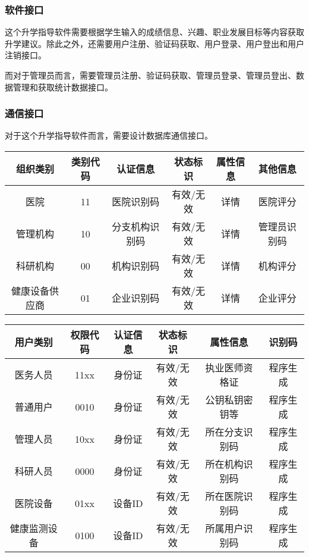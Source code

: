 \documentclass[UTF8]{ctexart}
\begin{document}
    \subsubsection{软件接口}
    这个升学指导软件需要根据学生输入的成绩信息、兴趣、职业发展目标等内容获取升学建议。除此之外，还需要用户注册、验证码获取、用户登录、用户登出和用户注销接口。

    而对于管理员而言，需要管理员注册、验证码获取、管理员登录、管理员登出、数据管理和获取统计数据接口。
    \subsubsection{通信接口}
    对于这个升学指导软件而言，需要设计数据库通信接口。

    
    \begin{center}
    \begin{tabular}{cccccc}
        \hline
        组织类别& 类别代码& 认证信息& 状态标识& 属性信息& 其他信息\\
        \hline
        医院& 11& 医院识别码& 有效/无效& 详情& 医院评分\\
        管理机构& 10& 分支机构识别码& 有效/无效& 详情& 管理员识别码\\
        科研机构& 00& 机构识别码& 有效/无效& 详情& 机构评分\\
        健康设备供应商& 01& 企业识别码& 有效/无效& 详情& 企业评分\\
        \hline
    \end{tabular}
    \end{center}
    
    \begin{center}
    \begin{tabular}{cccccc}
        \hline
        用户类别& 权限代码& 认证信息& 状态标识& 属性信息& 识别码\\
        \hline
        医务人员& 11xx& 身份证& 有效/无效& 执业医师资格证& 程序生成\\
        普通用户& 0010& 身份证& 有效/无效& 公钥私钥密钥等& 程序生成\\
        管理人员& 10xx& 身份证& 有效/无效& 所在分支识别码& 程序生成\\
        科研人员& 0000& 身份证& 有效/无效& 所在机构识别码& 程序生成\\
        医院设备& 01xx& 设备ID& 有效/无效& 所在医院识别码& 程序生成\\
        健康监测设备& 0100& 设备ID& 有效/无效& 所属用户识别码& 程序生成\\
        \hline
    \end{tabular}
    \end{center}
    
\end{document}

